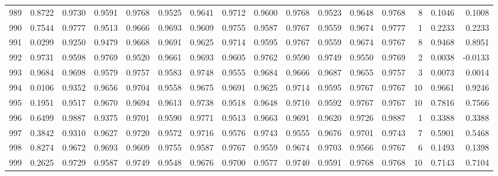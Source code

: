 \begin{tabular}{lrrrrrrrrrrrrrrr}
989 &      0.8722 &  0.9730 &  0.9591 &  0.9768 &  0.9525 &  0.9641 &  0.9712 &  0.9600 &  0.9768 &  0.9523 &   0.9648 &     0.9768 &      8 &                    0.1046 &                     0.1008 \\
990 &      0.7544 &  0.9777 &  0.9513 &  0.9666 &  0.9693 &  0.9609 &  0.9755 &  0.9587 &  0.9767 &  0.9559 &   0.9674 &     0.9777 &      1 &                    0.2233 &                     0.2233 \\
991 &      0.0299 &  0.9250 &  0.9479 &  0.9668 &  0.9691 &  0.9625 &  0.9714 &  0.9595 &  0.9767 &  0.9559 &   0.9674 &     0.9767 &      8 &                    0.9468 &                     0.8951 \\
992 &      0.9731 &  0.9598 &  0.9769 &  0.9520 &  0.9661 &  0.9693 &  0.9605 &  0.9762 &  0.9590 &  0.9749 &   0.9550 &     0.9769 &      2 &                    0.0038 &                    -0.0133 \\
993 &      0.9684 &  0.9698 &  0.9579 &  0.9757 &  0.9583 &  0.9748 &  0.9555 &  0.9684 &  0.9666 &  0.9687 &   0.9655 &     0.9757 &      3 &                    0.0073 &                     0.0014 \\
994 &      0.0106 &  0.9352 &  0.9656 &  0.9704 &  0.9558 &  0.9675 &  0.9691 &  0.9625 &  0.9714 &  0.9595 &   0.9767 &     0.9767 &     10 &                    0.9661 &                     0.9246 \\
995 &      0.1951 &  0.9517 &  0.9670 &  0.9694 &  0.9613 &  0.9738 &  0.9518 &  0.9648 &  0.9710 &  0.9592 &   0.9767 &     0.9767 &     10 &                    0.7816 &                     0.7566 \\
996 &      0.6499 &  0.9887 &  0.9375 &  0.9701 &  0.9590 &  0.9771 &  0.9513 &  0.9663 &  0.9691 &  0.9620 &   0.9726 &     0.9887 &      1 &                    0.3388 &                     0.3388 \\
997 &      0.3842 &  0.9310 &  0.9627 &  0.9720 &  0.9572 &  0.9716 &  0.9576 &  0.9743 &  0.9555 &  0.9676 &   0.9701 &     0.9743 &      7 &                    0.5901 &                     0.5468 \\
998 &      0.8274 &  0.9672 &  0.9693 &  0.9609 &  0.9755 &  0.9587 &  0.9767 &  0.9559 &  0.9674 &  0.9703 &   0.9566 &     0.9767 &      6 &                    0.1493 &                     0.1398 \\
999 &      0.2625 &  0.9729 &  0.9587 &  0.9749 &  0.9548 &  0.9676 &  0.9700 &  0.9577 &  0.9740 &  0.9591 &   0.9768 &     0.9768 &     10 &                    0.7143 &                     0.7104 \\
\bottomrule
\end{tabular}
